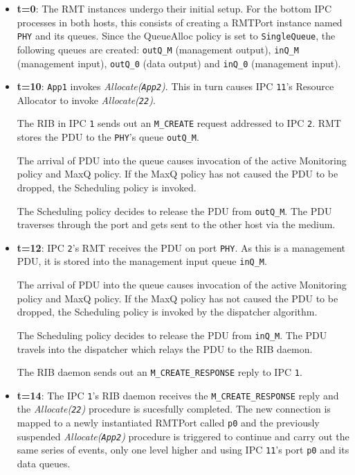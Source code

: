             \begin{itemize}
            \item \textbf{t=0}: The RMT instances undergo their initial setup. For the bottom IPC processes in both hosts, this consists of creating a RMTPort instance named \texttt{PHY} and its queues. Since the QueueAlloc policy is set to \texttt{SingleQueue}, the following queues are created: \texttt{outQ\_M} (management output), \texttt{inQ\_M} (management input), \texttt{outQ\_0} (data output) and \texttt{inQ\_0} (management input).

            \item \textbf{t=10}: \texttt{App1} invokes \emph{Allocate(\texttt{App2})}. This in turn causes IPC \texttt{11}'s Resource Allocator to invoke \emph{Allocate(\texttt{22})}.

                The RIB in IPC \texttt{1} sends out an \texttt{M\_CREATE} request addressed to IPC \texttt{2}. RMT stores the PDU to the \texttt{PHY}'s queue \texttt{outQ\_M}.

                The arrival of PDU into the queue causes invocation of the active Monitoring policy and MaxQ policy. If the MaxQ policy has not caused the PDU to be dropped, the Scheduling policy is invoked.

                The Scheduling policy decides to release the PDU from \texttt{outQ\_M}. The PDU traverses through the port and gets sent to the other host via the medium.

            \item \textbf{t=12}: IPC \texttt{2}'s RMT receives the PDU on port \texttt{PHY}. As this is a management PDU, it is stored into the management input queue \texttt{inQ\_M}.

                The arrival of PDU into the queue causes invocation of the active Monitoring policy and MaxQ policy. If the MaxQ policy has not caused the PDU to be dropped, the Scheduling policy is invoked by the dispatcher algorithm.

                The Scheduling policy decides to release the PDU from \texttt{inQ\_M}. The PDU travels into the dispatcher which relays the PDU to the RIB daemon.

                The RIB daemon sends out an \texttt{M\_CREATE\_RESPONSE} reply to IPC \texttt{1}.

            \item \textbf{t=14}: The IPC \texttt{1}'s RIB daemon receives the \texttt{M\_CREATE\_RESPONSE} reply and the \emph{Allocate(\texttt{22})} procedure is sucesfully completed. The new connection is mapped to a newly instantiated RMTPort called \texttt{p0} and the previously suspended \emph{Allocate(\texttt{App2})} procedure is triggered to continue and carry out the same series of events, only one level higher and using IPC \texttt{11}'s port \texttt{p0} and its data queues.


\end{itemize}
